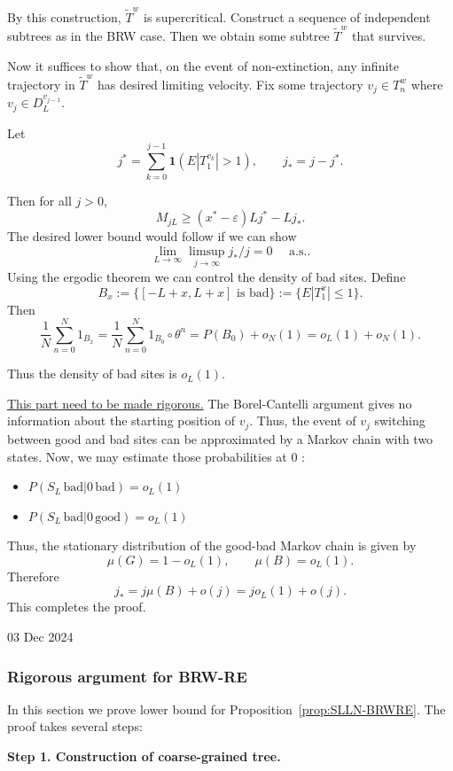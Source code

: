 By this construction, $\tilde T^w$ is supercritical. Construct a sequence of independent subtrees as in the BRW case. Then we obtain some subtree $\tilde T^w$ that survives.

Now it suffices to show that, on the event of non-extinction, any infinite trajectory in $\tilde T^w$ has desired limiting velocity. Fix some trajectory $v_j \in T^w_n$ where $v_{j} \in D^{v_{j - 1}}_L$.

Let
\[
	j^* = \sum_{k = 0}^{j - 1} \mathbf{1}\left( E|T_1^{v_k}| > 1 \right) , \qquad j_* = j - j^*
.\] 

Then for all $j > 0$,
\[
	M_{j L} \ge (x^* - \varepsilon) L j^* - L j_*
.\] 
The desired lower bound would follow if we can show
\[
	\lim_{L \to \infty}  \limsup_{j \to \infty } j_* / j  = 0 \quad \text{ a.s.}
.\] 
Using the ergodic theorem we can control the density of bad sites. Define
\[
	B_x := \{[-L + x, L + x] \text{ is bad}\}  := \{E|T^x_1| \le 1\} 
.\] 
Then
\[
	\frac{1}{N} \sum_{n=0}^{N} 1_{B_x} = \frac{1}{N} \sum_{n=0}^{N} 1_{B_0} \circ \theta^n = P(B_0) + o_N(1) = o_L(1) + o_N(1)
.\] 

Thus the density of bad sites is $o_L(1)$.

\underline{This part need to be made rigorous.} The Borel-Cantelli argument gives no information about the starting position of $v_j$. Thus, the event of $v_j$ switching between good and bad sites can be approximated by a Markov chain with two states. Now, we may estimate those probabilities at $0$ :
\begin{itemize}
	\item $P(S_L \,\text{bad} | 0\, \text{bad} ) = o_L(1)$
	\item $P(S_L \,\text{bad} | 0\, \text{good} ) = o_L(1)$
\end{itemize}

Thus, the stationary distribution of the good-bad Markov chain is given by
\[
	\mu(G) = 1 - o_L(1), \qquad \mu(B) = o_L(1)
.\] 
Therefore
\[
	j_* = j \mu(B) + o(j) = j o_L(1) + o(j)
.\] 
This completes the proof.


03 Dec 2024

\subsubsection{Rigorous argument for BRW-RE}

In this section we prove lower bound for Proposition~\ref{prop:SLLN-BRWRE}. The proof takes several steps:

\textbf{Step 1. Construction of coarse-grained tree.}

